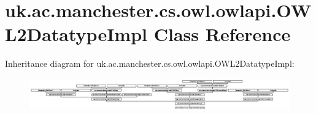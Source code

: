 \hypertarget{classuk_1_1ac_1_1manchester_1_1cs_1_1owl_1_1owlapi_1_1_o_w_l2_datatype_impl}{\section{uk.\-ac.\-manchester.\-cs.\-owl.\-owlapi.\-O\-W\-L2\-Datatype\-Impl Class Reference}
\label{classuk_1_1ac_1_1manchester_1_1cs_1_1owl_1_1owlapi_1_1_o_w_l2_datatype_impl}
}
Inheritance diagram for uk.\-ac.\-manchester.\-cs.\-owl.\-owlapi.\-O\-W\-L2\-Datatype\-Impl\-:\begin{figure}[H]
\begin{center}
\leavevmode
\includegraphics[height=1.400500cm]{classuk_1_1ac_1_1manchester_1_1cs_1_1owl_1_1owlapi_1_1_o_w_l2_datatype_impl}
\end{center}
\end{figure}
